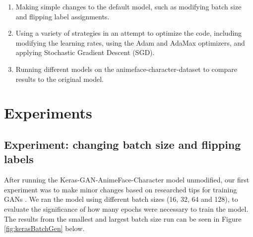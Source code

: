 \documentclass{article} %
\begin{document}
\begin{enumerate}
	\item Making simple changes to the default model, such as modifying batch size and flipping label assignments. 
	\item Using a variety of strategies in an attempt to optimize the code, including modifying the learning rates, using the Adam and AdaMax optimizers, and applying Stochastic Gradient Descent (SGD).
	\item Running different models on the animeface-character-dataset to compare results to the original model.
\end{enumerate}

\section{Experiments}

\subsection{Experiment: changing batch size and flipping labels}
After running the Keras-GAN-AnimeFace-Character model unmodified, our first experiment was to make minor changes based on researched tips for training GANs \cite{ganTrainTips}. We ran the model using different batch sizes (16, 32, 64 and 128), to evaluate the significance of how many epochs were necessary to train the model. The results from the smallest and largest batch size run can be seen in Figure \ref{fig:kerasBatchGen} below.
\end{document}
